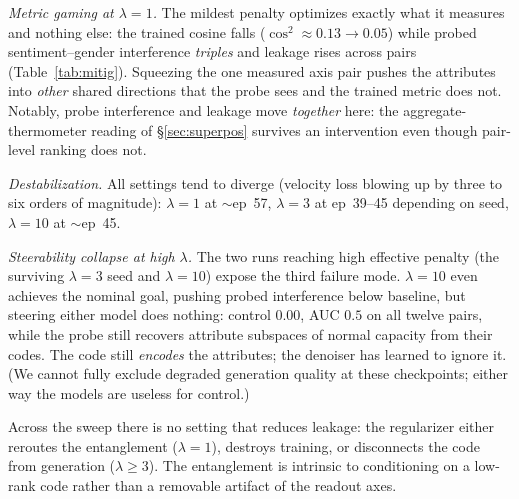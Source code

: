 \documentclass[11pt]{article}
\begin{document}
\emph{Metric gaming at $\lambda{=}1$.} The mildest penalty optimizes exactly what it
measures and nothing else: the trained cosine falls ($\cos^2\approx0.13\!\to\!0.05$)
while probed sentiment--gender interference \emph{triples} and leakage rises across
pairs (Table~\ref{tab:mitig}). Squeezing the one measured axis pair pushes the
attributes into \emph{other} shared directions that the probe sees and the trained
metric does not. Notably, probe interference and leakage move \emph{together} here:
the aggregate-thermometer reading of \S\ref{sec:superpos} survives an intervention
even though pair-level ranking does not.

\emph{Destabilization.} All settings tend to diverge (velocity loss blowing up by
three to six orders of magnitude): $\lambda{=}1$ at $\sim$ep~57, $\lambda{=}3$ at
ep~39--45 depending on seed, $\lambda{=}10$ at $\sim$ep~45.

\emph{Steerability collapse at high $\lambda$.} The two runs reaching high effective
penalty (the surviving $\lambda{=}3$ seed and $\lambda{=}10$) expose the third
failure mode. $\lambda{=}10$ even achieves the nominal goal, pushing probed
interference below baseline, but steering either model does nothing: control $0.00$,
AUC $0.5$ on all twelve pairs, while the probe still recovers attribute subspaces of
normal capacity from their codes. The code still \emph{encodes} the attributes; the
denoiser has learned to ignore it. (We cannot fully exclude degraded generation
quality at these checkpoints; either way the models are useless for control.)

Across the sweep there is no setting that reduces leakage: the regularizer either
reroutes the entanglement ($\lambda{=}1$), destroys training, or disconnects the
code from generation ($\lambda{\geq}3$). The entanglement is intrinsic to
conditioning on a low-rank code rather than a removable artifact of the readout
axes.
\end{document}
